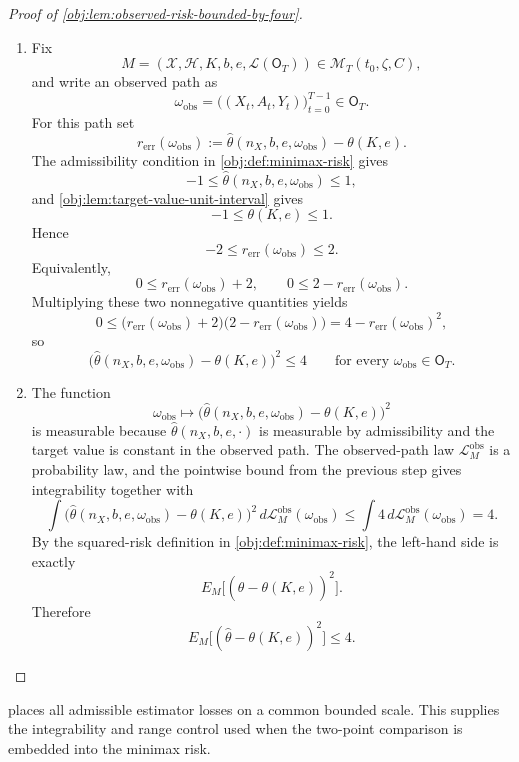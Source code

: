 \documentclass[11pt]{article}
\begin{document}
\begin{proof}[Proof of \cref{obj:lem:observed-risk-bounded-by-four}]
\begin{enumerate}
\item Fix
\[
M=(\mathcal X,\mathcal H,K,b,e,\mathcal L(\mathsf O_T))\in
\mathcal M_T(t_0,\zeta,C),
\]
and write an observed path as
\[
\omega_{\mathrm{obs}}=\bigl((X_t,A_t,Y_t)\bigr)_{t=0}^{T-1}\in \mathsf O_T .
\]
For this path set
\[
r_{\mathrm{err}}(\omega_{\mathrm{obs}})
:=
\widehat\theta(n_X,b,e,\omega_{\mathrm{obs}})-\theta(K,e).
\]
The admissibility condition in \cref{obj:def:minimax-risk} gives
\[
-1\le \widehat\theta(n_X,b,e,\omega_{\mathrm{obs}})\le 1,
\]
and \cref{obj:lem:target-value-unit-interval} gives
\[
-1\le \theta(K,e)\le 1 .
\]
Hence
\[
-2\le r_{\mathrm{err}}(\omega_{\mathrm{obs}})\le 2 .
\]
Equivalently,
\[
0\le r_{\mathrm{err}}(\omega_{\mathrm{obs}})+2,
\qquad
0\le 2-r_{\mathrm{err}}(\omega_{\mathrm{obs}}).
\]
Multiplying these two nonnegative quantities yields
\[
0\le
\bigl(r_{\mathrm{err}}(\omega_{\mathrm{obs}})+2\bigr)
\bigl(2-r_{\mathrm{err}}(\omega_{\mathrm{obs}})\bigr)
=
4-r_{\mathrm{err}}(\omega_{\mathrm{obs}})^2,
\]
so
\[
\bigl(\widehat\theta(n_X,b,e,\omega_{\mathrm{obs}})-\theta(K,e)\bigr)^2
\le 4
\qquad
\text{for every }\omega_{\mathrm{obs}}\in\mathsf O_T .
\] %

\item The function
\[
\omega_{\mathrm{obs}}
\longmapsto
\bigl(\widehat\theta(n_X,b,e,\omega_{\mathrm{obs}})-\theta(K,e)\bigr)^2
\]
is measurable because \(\widehat\theta(n_X,b,e,\cdot)\) is measurable by admissibility and the target value is constant in the observed path. The observed-path law \(\mathcal L_M^{\mathrm{obs}}\) is a probability law, and the pointwise bound from the previous step gives integrability together with
\[
\int
\bigl(\widehat\theta(n_X,b,e,\omega_{\mathrm{obs}})-\theta(K,e)\bigr)^2
\,d\mathcal L_M^{\mathrm{obs}}(\omega_{\mathrm{obs}})
\le
\int 4\,d\mathcal L_M^{\mathrm{obs}}(\omega_{\mathrm{obs}})
=
4 .
\]
By the squared-risk definition in \cref{obj:def:minimax-risk}, the left-hand side is exactly
\[
E_M\bigl[(\widehat\theta-\theta(K,e))^2\bigr].
\]
Therefore
\[
E_M\bigl[(\widehat\theta-\theta(K,e))^2\bigr]\le 4 .
\] %
\end{enumerate}
\end{proof}

 places all admissible estimator losses on a common bounded scale. This supplies the integrability and range control used when the two-point comparison is embedded into the minimax risk.
\end{document}
